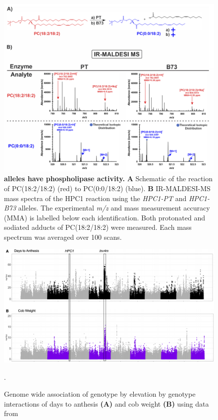 \begin{figure}[t]
\begin{center}
\includegraphics[width=\linewidth]{Sup_Figures/Sup_Fig_8.png}
\caption[\hpc alleles have phospholipase activity.]
{\textbf{\hpc alleles have phospholipase activity.}
\textbf{A} Schematic of the \hpc reaction of PC(18:2/18:2) (red) to
PC(0:0/18:2) (blue). 
\textbf{B} IR-MALDESI-MS mass spectra of the HPC1 reaction using the \textit{HPC1-PT} and \textit{HPC1-B73} alleles. The
experimental \textit{m/z} and mass measurement accuracy (MMA) is labelled below each
identification. 
Both protonated and sodiated adducts of PC(18:2/18:2) were measured. 
Each mass spectrum was averaged over 100 scans.}
\label{figure:Sup:MS_spectra}
\end{center}
\end{figure} 
\clearpage

\begin{figure}[t]
\begin{center}
\includegraphics[width=0.8 \paperwidth]{Sup_Figures/Sup_Fig_9.png}
\caption[Genome wide association of genotype by elevation by genotype interactions of days to anthesis.]{Genome wide association of genotype by elevation by genotype interactions of days to anthesis \textbf{(A)} and cob weight \textbf{(B)} using data from \cite{gates2019-xu}}.
\label{figure:Sup:GxE_scan}
\end{center}
\end{figure} 
\clearpage

